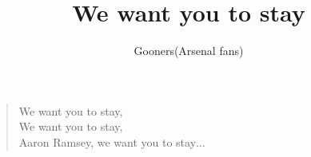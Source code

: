 \documentclass[a4paper,12pt]{article}
\title{We want you to stay}
\author{Gooners(Arsenal fans)}
\date{}
\begin{document}
	
	\maketitle
	
	\begin{verse}
		
		We want you to stay, \\
		We want you to stay, \\
		Aaron Ramsey, we want you to stay$\ldots$
		
	\end{verse}
	
\end{document}
